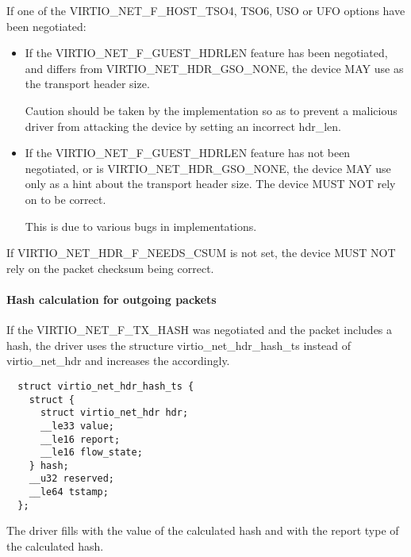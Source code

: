 If one of the VIRTIO_NET_F_HOST_TSO4, TSO6, USO or UFO options have
been negotiated:
\begin{itemize}
\item If the VIRTIO_NET_F_GUEST_HDRLEN feature has been negotiated,
	and  differs from VIRTIO_NET_HDR_GSO_NONE,
	the device MAY use  as the transport header size.

	\begin{note}
	Caution should be taken by the implementation so as to prevent
	a malicious driver from attacking the device by setting an incorrect hdr_len.
	\end{note}

\item If the VIRTIO_NET_F_GUEST_HDRLEN feature has not been negotiated,
	or  is VIRTIO_NET_HDR_GSO_NONE,
	the device MAY use  only as a hint about the
	transport header size.
	The device MUST NOT rely on  to be correct.

	\begin{note}
	This is due to various bugs in implementations.
	\end{note}
\end{itemize}

If VIRTIO_NET_HDR_F_NEEDS_CSUM is not set, the device MUST NOT
rely on the packet checksum being correct.

\paragraph{Hash calculation for outgoing packets}
\label{sec:Device Types / Network Device / Device Operation / Packet Transmission / Hash calculation for outgoing packets }

If the VIRTIO_NET_F_TX_HASH was negotiated and the packet includes a hash, the driver uses
the structure virtio_net_hdr_hash_ts instead of virtio_net_hdr and increases the  accordingly.

\begin{lstlisting}
  struct virtio_net_hdr_hash_ts {
    struct {
      struct virtio_net_hdr hdr;
      __le33 value;
      __le16 report;
      __le16 flow_state;
    } hash;
    __u32 reserved;
    __le64 tstamp;
  };
\end{lstlisting}

The driver fills  with the value of the calculated hash and  with the report type of the calculated hash.

